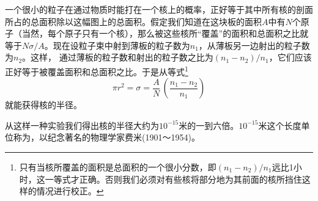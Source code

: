 一个很小的粒子在通过物质时能打在一个核上的概率，正好等于其中所有核的剖面所占的总面积除以这幅图上的总面积。假定我们知道在这块板的面积$A$中有$N$个原子（当然，每个原子只有一个核），那么被这些核所“覆盖”的面积和总面积之比就等于$N \sigma / A$。现在设粒子束中射到薄板的粒子数为$n_1$，从薄板另一边射出的粒子数为$n_2$。这样， 通过薄板的粒子数和射出的粒子数之比为$(n_1-n_2)/n_1$，它们应该正好等于被覆盖面积和总面积之比。于是从等式\footnote{只有当核所覆盖的面积是总面积的一个很小分数，即$(n_1-n_2)/n_1$远比1小时，这一等式才正确。否则我们必须对有些核将部分地为其前面的核所挡住这样的情况进行校正。}
\begin{equation*}
\pi r^2=\sigma=\frac{A}{N}\,
(\frac{n_1-n_2}{n_1})
\end{equation*}
就能获得核的半径。

从这样一种实验我们得出核的半径大约为$10^{-15}$米的一到六倍。$10^{-15}$米这个长度单位称为，以纪念著名的物理学家费米(1901～1954)。

